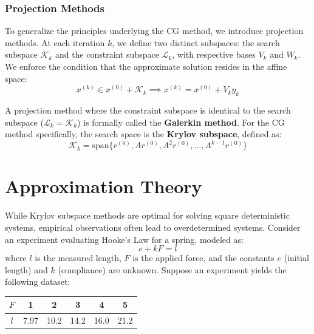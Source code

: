 \documentclass[12pt, a4paper]{article}
\theoremstyle{break}
\begin{document}
\subsubsection*{Projection Methods}
To generalize the principles underlying the CG method, we introduce projection methods.
At each iteration $k$, we define two distinct subspaces: the search subspace $\mathcal{K}_k$ and the constraint subspace $\mathcal{L}_k$, with respective bases $V_k$ and $W_k$.
We enforce the condition that the approximate solution resides in the affine space:
\begin{equation*}
    x^{(k)} \in x^{(0)} + \mathcal{K}_k \implies x^{(k)} = x^{(0)} + V_k y_k
\end{equation*}

A projection method where the constraint subspace is identical to the search subspace ($\mathcal{L}_k = \mathcal{K}_k$) is formally called the \textbf{Galerkin method}.
For the CG method specifically, the search space is the \textbf{Krylov subspace}, defined as:
\begin{equation*}
    \mathcal{K}_k = \text{span}\{r^{(0)}, A r^{(0)}, A^2 r^{(0)}, \dots, A^{k-1} r^{(0)}\}
\end{equation*}

\section{Approximation Theory}

While Krylov subspace methods are optimal for solving square deterministic systems, empirical observations often lead to overdetermined systems.
Consider an experiment evaluating Hooke's Law for a spring, modeled as:
\begin{equation*}
    e + kF = l
\end{equation*}
where $l$ is the measured length, $F$ is the applied force, and the constants $e$ (initial length) and $k$ (compliance) are unknown.
Suppose an experiment yields the following dataset:
\begin{table}[H]
\centering
\begin{tabular}{c|ccccc}
    $F$ & 1 & 2 & 3 & 4 & 5 \\ \hline
    $l$ & 7.97 & 10.2 & 14.2 & 16.0 & 21.2 
\end{tabular}
\end{table}
\end{document}
